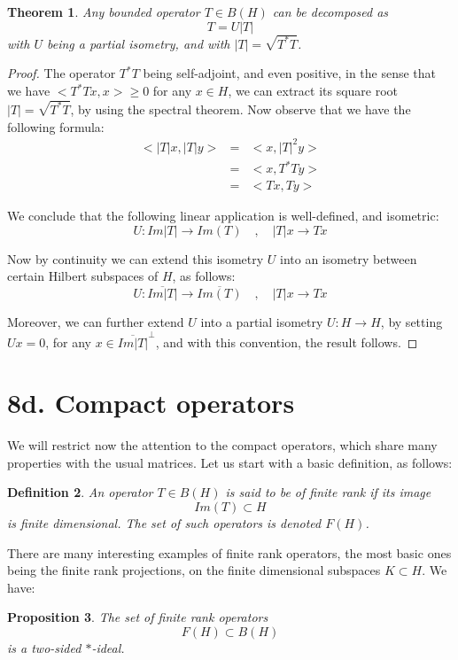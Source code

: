 \documentclass[12pt]{amsbook}
\newtheorem{theorem}{Theorem}[chapter]
\newtheorem{definition}[theorem]{Definition}
\newtheorem{proposition}[theorem]{Proposition}
\begin{document}
\begin{theorem}
Any bounded operator $T\in B(H)$ can be decomposed as
$$T=U|T|$$
with $U$ being a partial isometry, and with $|T|=\sqrt{T^*T}$.
\end{theorem}

\begin{proof}
The operator $T^*T$ being self-adjoint, and even positive, in the sense that we have $<T^*Tx,x>\geq0$ for any $x\in H$, we can extract its square root $|T|=\sqrt{T^*T}$, by using the spectral theorem. Now observe that we have the following formula:
\begin{eqnarray*}
<|T|x,|T|y>
&=&<x,|T|^2y>\\
&=&<x,T^*Ty>\\
&=&<Tx,Ty>
\end{eqnarray*}

We conclude that the following linear application is well-defined, and isometric:
$$U:Im|T|\to Im(T)\quad,\quad 
|T|x\to Tx$$

Now by continuity we can extend this isometry $U$ into an isometry between certain Hilbert subspaces of $H$, as follows:
$$U:\overline{Im|T|}\to\overline{Im(T)}\quad,\quad 
|T|x\to Tx$$

Moreover, we can further extend $U$ into a partial isometry $U:H\to H$, by setting $Ux=0$, for any $x\in\overline{Im|T|}^\perp$, and with this convention, the result follows. 
\end{proof}

\section*{8d. Compact operators} 

We will restrict now the attention to the compact operators, which share many properties with the usual matrices. Let us start with a basic definition, as follows:


\begin{definition}
An operator $T\in B(H)$ is said to be of finite rank if its image 
$$Im(T)\subset H$$ 
is finite dimensional. The set of such operators is denoted $F(H)$.
\end{definition}

There are many interesting examples of finite rank operators, the most basic ones being the finite rank projections, on the finite dimensional subspaces $K\subset H$. We have:

\begin{proposition}
The set of finite rank operators
$$F(H)\subset B(H)$$
is a two-sided $*$-ideal.
\end{proposition}
\end{document}
